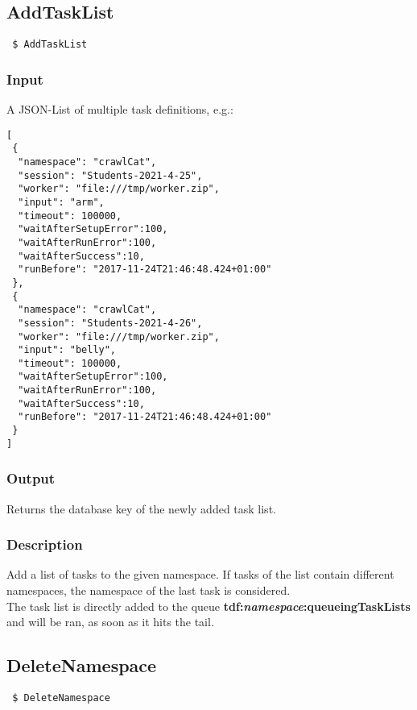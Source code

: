\documentclass[a4paper,11pt]{article}
\begin{document}
\newpage


\subsection{AddTaskList\label{cmd:AddTaskList}}
\begin{verbatim}
 $ AddTaskList
\end{verbatim}

\subsubsection{Input}
A JSON-List of multiple task definitions, e.g.:
\begin{verbatim}
[
 {
  "namespace": "crawlCat",
  "session": "Students-2021-4-25",
  "worker": "file:///tmp/worker.zip",
  "input": "arm",
  "timeout": 100000,
  "waitAfterSetupError":100,
  "waitAfterRunError":100,
  "waitAfterSuccess":10,
  "runBefore": "2017-11-24T21:46:48.424+01:00"
 },
 {
  "namespace": "crawlCat",
  "session": "Students-2021-4-26",
  "worker": "file:///tmp/worker.zip",
  "input": "belly",
  "timeout": 100000,
  "waitAfterSetupError":100,
  "waitAfterRunError":100,
  "waitAfterSuccess":10,
  "runBefore": "2017-11-24T21:46:48.424+01:00"
 }
]
\end{verbatim}

\subsubsection{Output}
Returns the database key of the newly added task list.

\subsubsection{Description}
Add a list of tasks to the given namespace. If tasks of the list contain different namespaces, the namespace of the last task is considered.\\
The task list is directly added to the queue \textbf{tdf:\textit{namespace}:queueingTaskLists} and will be ran, as soon as it hits the tail.

\newpage


\subsection{DeleteNamespace\label{cmd:DeleteNamespace}}
\begin{verbatim}
 $ DeleteNamespace
\end{verbatim}
\end{document}
